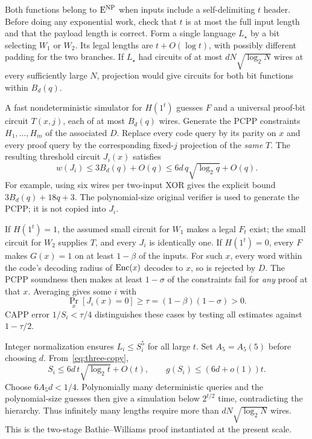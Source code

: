 Both functions belong to $\mathrm{E}^{\mathrm{NP}}$ when inputs include a self-delimiting
$t$ header. Before doing any exponential work, check that $t$ is at
most the full input length and that the payload length is correct.
Form a single language $L_\star$ by a bit selecting $W_1$ or $W_2$.
Its legal lengths are $t+O(\log t)$, with possibly different padding
for the two branches. If $L_\star$ had circuits of at most
$dN\sqrt{\log_2N}$ wires at every sufficiently large $N$, projection
would give circuits for both bit functions within $B_d(q)$.

A fast nondeterministic simulator for $H(1^t)$ guesses $F$ and a
universal proof-bit circuit $T(x,j)$, each of at most $B_d(q)$ wires.
Generate the PCPP constraints $H_1,\ldots,H_m$ of the associated
$D$. Replace every code query by its parity on $x$ and every proof
query by the corresponding fixed-$j$ projection of the \emph{same}
$T$. The resulting threshold circuit $J_i(x)$ satisfies
\begin{equation}\label{eq:three-copy}
 w(J_i)\le3B_d(q)+O(q)
       \le6d\,q\sqrt{\log_2q}+O(q).
\end{equation}
For example, using six wires per two-input XOR gives the explicit
bound $3B_d(q)+18q+3$. The polynomial-size original verifier is used
to generate the PCPP; it is not copied into $J_i$.

If $H(1^t)=1$, the assumed small circuit for $W_1$ makes a legal
$F_t$ exist; the small circuit for $W_2$ supplies $T$, and every
$J_i$ is identically one. If $H(1^t)=0$, every $F$ makes $G(x)=1$
on at least $1-\beta$ of the inputs. For such $x$, every word within
the code's decoding radius of $\operatorname{Enc}(x)$ decodes to $x$, so is rejected
by $D$. The PCPP soundness then makes at least $1-\sigma$ of the
constraints fail for \emph{any} proof at that $x$. Averaging gives
some $i$ with
\[
 \Pr_x[J_i(x)=0]\ge\tau=(1-\beta)(1-\sigma)>0.
\]
CAPP error $1/S_i<\tau/4$ distinguishes these cases by testing all
estimates against $1-\tau/2$.

Integer normalization ensures $L_i\le S_i^5$ for all large $t$.
Set $A_5=A_5(5)$ before choosing $d$. From~\eqref{eq:three-copy},
\[
 S_i\le6d\,t\sqrt{\log_2t}+O(t),\qquad
 g(S_i)\le(6d+o(1))t.
\]
Choose $6A_5d<1/4$. Polynomially many deterministic queries and the
polynomial-size guesses then give a simulation below $2^{t/2}$ time,
contradicting the hierarchy. Thus infinitely many lengths require
more than $dN\sqrt{\log_2N}$ wires. This is the two-stage
Bathie--Williams proof instantiated at the present scale.

